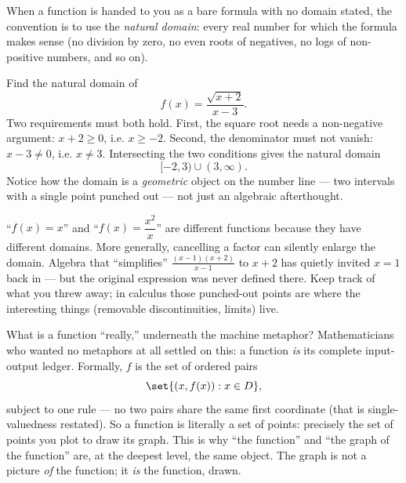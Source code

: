 When a function is handed to you as a bare formula with no domain stated, the
convention is to use the \emph{natural domain}: every real number for which the
formula makes sense (no division by zero, no even roots of negatives, no logs of
non-positive numbers, and so on).

\begin{example}
\label{ch02:ex-natural-domain}
Find the natural domain of
\[
  f(x) = \frac{\sqrt{x+2}}{\,x-3\,}.
\]
Two requirements must both hold. First, the square root needs a non-negative
argument: $x+2 \ge 0$, i.e. $x \ge -2$. Second, the denominator must not vanish:
$x - 3 \ne 0$, i.e. $x \ne 3$. Intersecting the two conditions gives the natural
domain
\[
  [-2, 3) \cup (3, \infty).
\]
Notice how the domain is a \emph{geometric} object on the number line --- two
intervals with a single point punched out --- not just an algebraic afterthought.
\end{example}

\begin{trapbox}
``$f(x) = x$'' and ``$f(x) = \dfrac{x^2}{x}$'' are different functions because they
have different domains. More generally, cancelling a factor can silently enlarge
the domain. Algebra that ``simplifies'' $\frac{(x-1)(x+2)}{x-1}$ to $x+2$ has
quietly invited $x=1$ back in --- but the original expression was never defined
there. Keep track of what you threw away; in calculus those punched-out points are
where the interesting things (removable discontinuities, limits) live.
\end{trapbox}

\begin{happeningbox}
What is a function ``really,'' underneath the machine metaphor? Mathematicians who
wanted no metaphors at all settled on this: a function \emph{is} its complete
input-output ledger. Formally, $f$ is the set of ordered pairs
\[
  \set{ (x, f(x)) : x \in D },
\]
subject to one rule --- no two pairs share the same first coordinate (that is
single-valuedness restated). So a function is literally a set of points: precisely
the set of points you plot to draw its graph. This is why ``the function'' and
``the graph of the function'' are, at the deepest level, the same object. The
graph is not a picture \emph{of} the function; it \emph{is} the function, drawn.
\end{happeningbox}

